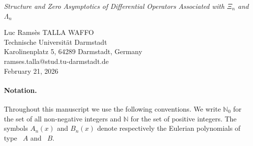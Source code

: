 \documentclass[11pt,twoside]{article}
\newcommand{\HeadTitleTwo}{\begin{center}
\Large{\textit{Structure and Zero Asymptotics of Differential Operators Associated with \texorpdfstring{\({\Xi}_n\)}{Xi_n} and \texorpdfstring{\({\Lambda}_n\)}{Lambda_n}}}
\end{center}}
\providecommand{\HeadTitleTwo}{} %
\numberwithin{equation}{section}
\begin{document}
\thispagestyle{fancy}

\vspace{0.2cm}

\begin{center}
\Large{\HeadTitleTwo}
\end{center}

\hspace{3cm}

\begin{center}
Luc Ramsès TALLA WAFFO \\
Technische Universität Darmstadt\\
Karolinenplatz 5, 64289 Darmstadt, Germany\\
ramses.talla@stud.tu-darmstadt.de\\
\vspace{0.5cm}
February 21, 2026
\end{center}

 
\begin{abstract}
We study the second-order differential operators \(\mathcal D_{\Xi}\) and \(\mathcal D_{\Lambda}\) associated with the rescaled polynomial families \((\widetilde{\Xi}_n)\) and \((\widetilde{\Lambda}_n)\), and more generally the polynomial sequences generated by iterating these operators from an arbitrary linear initial datum \(cx-d\).

We establish structural properties of \(\mathcal D_{\Xi}\) and \(\mathcal D_{\Lambda}\), including factorizations into first-order operators, weighted divergence forms, formal self-adjointness, and hypergeometric descriptions of the corresponding formal eigenvalue equations. We also show that both operators preserve hyperbolicity, preserve zeros in \((0,b)\) for \(b\ge 1\), and preserve proper position.

For the iterated polynomial sequences, we derive explicit closed formulae in terms of the auxiliary families \((\widetilde{\Xi}_n)\) and \((\widetilde{\Lambda}_n)\), prove strict interlacing of consecutive zeros under explicit conditions on \(d/c\), and obtain asymptotic formulae for the normalized logarithmic derivatives. As a consequence, the associated zero counting measures converge weakly to the same limiting probability measure as in the auxiliary case.
\end{abstract}

\vspace{0.2cm}

\paragraph{Notation.}
Throughout this manuscript we use the following conventions. 
We write $\mathbb{N}_0$ for the set of all non-negative integers and $\mathbb{N}$ for the set of positive integers. 
The symbols $A_n(x)$ and $B_n(x)$ denote respectively the Eulerian polynomials of type ~$A$ and ~$B$. 
\end{document}
